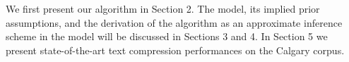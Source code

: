 % 



We first present our algorithm in Section 2.
The model, its implied prior assumptions, and the derivation of the algorithm as an approximate inference scheme in the model will be discussed in Sections 3 and 4. 
In Section 5 we present state-of-the-art text compression performances on the Calgary corpus.





